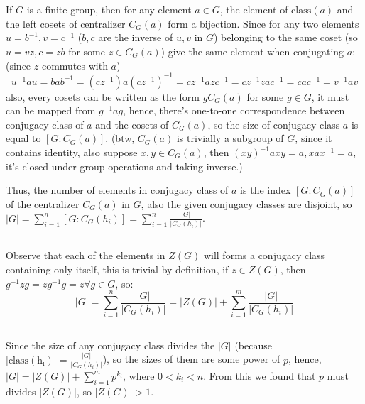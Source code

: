 \documentclass[12pt]{article}
\begin{document}
\section{}
\subsection{}
If $G$ is a finite group, then for any element $a\in G$, the element of $\mathrm{class}(a)$ and the left cosets of centralizer $C_G(a)$ form a bijection. Since for any two elements $u=b^{-1},v=c^{-1}$ ($b,c$ are the inverse of $u,v$ in $G$) belonging to the same coset (so $u=vz,c=zb$ for some $z\in C_G(a)$) give the same element when conjugating $a$: (since $z$ commutes with $a$)
$$u^{-1}au=bab^{-1}=(cz^{-1})a(cz^{-1})^{-1}=cz^{-1}azc^{-1}=cz^{-1}zac^{-1}=cac^{-1}=v^{-1}av$$
also, every cosets can be written as the form $gC_G(a)$ for some $g\in G$, it must can be mapped from $g^{-1}ag$, hence, there's one-to-one correspondence between conjugacy class of $a$ and the cosets of $C_G(a)$, so the size of conjugacy class $a$ is equal to $[G:C_G(a)]$. (btw, $C_G(a)$ is trivially a subgroup of $G$, since it contains identity, also suppose $x,y\in C_G(a)$, then $(xy)^{-1}axy=a, xax^{-1}=a$, it's closed under group operations and taking inverse.)

Thus, the number of elements in conjugacy class of $a$ is the index $[G:C_G(a)]$ of the centralizer $C_G(a)$ in $G$, also the given conjugacy classes are disjoint, so $|G|=\displaystyle\sum^n_{i=1}[G:C_G(h_i)]=\displaystyle\sum^n_{i=1}\frac{|G|}{|C_G(h_i)|}$.

\subsection{}
Observe that each of the elements in $Z(G)$ will forms a conjugacy class containing only itself, this is trivial by definition, if $z\in Z(G)$, then $g^{-1}zg=zg^{-1}g=z\forall g\in G$, so:
$$|G|=\displaystyle\sum^n_{i=1}\frac{|G|}{|C_G(h_i)|}=|Z(G)|+\displaystyle\sum^m_{i=1}\frac{|G|}{|C_G(h_i)|}$$
\subsection{}
Since the size of any conjugacy class divides the $|G|$ (because $|\mathrm{class(h_i)}|=\frac{|G|}{|C_G(h_i)|}$), so the sizes of them are some power of $p$, hence, $|G|=|Z(G)|+\displaystyle\sum^m_{i=1}p^{k_i}$, where $0<k_i<n$. From this we found that $p$ must divides $|Z(G)|$, so $|Z(G)|>1$.
\end{document}
